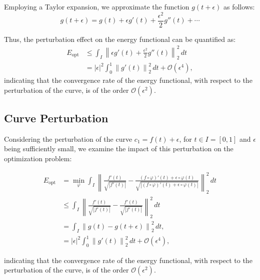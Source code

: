 Employing a Taylor expansion, we approximate the function $g(t + \epsilon)$ as follows:
\begin{equation*}
    g(t + \epsilon) = g(t) + \epsilon g'(t) + \frac{\epsilon^2}{2}g''(t) + \cdots
\end{equation*}

Thus, the perturbation effect on the energy functional can be quantified as:
\begin{equation}
    \begin{aligned}
        E_{\mathrm{opt}} 
        &\leq \int_I \left\| \epsilon g'(t) + \frac{\epsilon^2}{2}g''(t) \right\|_2^2 \, dt \\
        &= |\epsilon|^2 \int_0^1 \left\| g'(t) \right\|_2^2 \, dt + \mathcal{O}(\epsilon^4),
    \end{aligned}   
\end{equation}
indicating that the convergence rate of the energy functional, with respect to the perturbation of the curve, is of the order $\mathcal{O}(\epsilon^2)$.

\subsection{Curve Perturbation}

Considering the perturbation of the curve $c_1 = f(t) + \epsilon$, for $t \in I = [0, 1]$ and $\epsilon$ being sufficiently small, we examine the impact of this perturbation on the optimization problem:

\begin{equation}
    \begin{aligned}
        E_{\mathrm{opt}} 
        &= \min_{\varphi} \int_I \left\| \frac{f'(t)}{\sqrt{|f'(t)|}} - \frac{(f \circ \varphi)'(t) + \epsilon \circ \varphi(t)}{\sqrt{|(f \circ \varphi)'(t) + \epsilon \circ \varphi(t)|}} \right\|_2^2 \, dt \\
        &\leq \int_I \left\| \frac{f'(t)}{\sqrt{|f'(t)|}} - \frac{f'(t)}{\sqrt{|f'(t)|}} \right\|_2^2 \, dt \\
        &= \int_I \left\| g(t) - g(t + \epsilon) \right\|_2^2 \, dt, \\ 
        &= |\epsilon|^2 \int_0^1 \left\| g'(t) \right\|_2^2 \, dt + \mathcal{O}(\epsilon^4),
    \end{aligned}
\end{equation}

indicating that the convergence rate of the energy functional, with respect to the perturbation of the curve, is of the order $\mathcal{O}(\epsilon^2)$.


